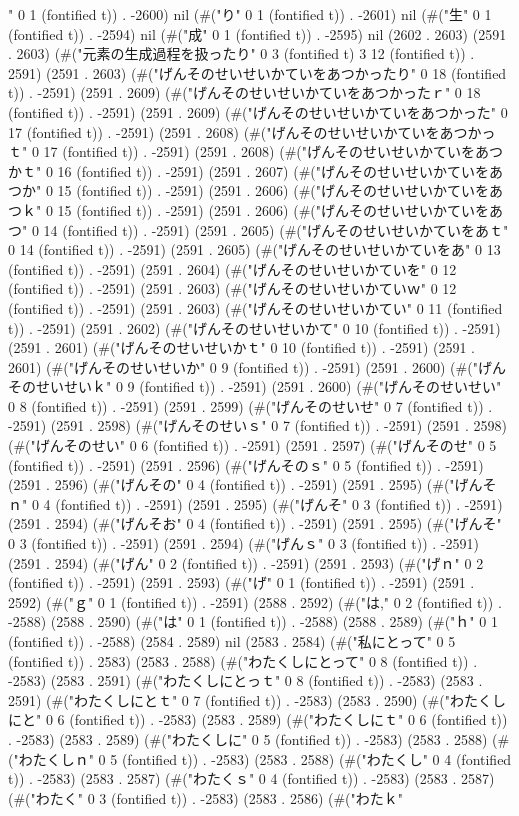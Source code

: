 " 0 1 (fontified t)) . -2600) nil (#("り" 0 1 (fontified t)) . -2601) nil (#("生" 0 1 (fontified t)) . -2594) nil (#("成" 0 1 (fontified t)) . -2595) nil (2602 . 2603) (2591 . 2603) (#("元素の生成過程を扱ったり" 0 3 (fontified t) 3 12 (fontified t)) . 2591) (2591 . 2603) (#("げんそのせいせいかていをあつかったり" 0 18 (fontified t)) . -2591) (2591 . 2609) (#("げんそのせいせいかていをあつかったｒ" 0 18 (fontified t)) . -2591) (2591 . 2609) (#("げんそのせいせいかていをあつかった" 0 17 (fontified t)) . -2591) (2591 . 2608) (#("げんそのせいせいかていをあつかっｔ" 0 17 (fontified t)) . -2591) (2591 . 2608) (#("げんそのせいせいかていをあつかｔ" 0 16 (fontified t)) . -2591) (2591 . 2607) (#("げんそのせいせいかていをあつか" 0 15 (fontified t)) . -2591) (2591 . 2606) (#("げんそのせいせいかていをあつｋ" 0 15 (fontified t)) . -2591) (2591 . 2606) (#("げんそのせいせいかていをあつ" 0 14 (fontified t)) . -2591) (2591 . 2605) (#("げんそのせいせいかていをあｔ" 0 14 (fontified t)) . -2591) (2591 . 2605) (#("げんそのせいせいかていをあ" 0 13 (fontified t)) . -2591) (2591 . 2604) (#("げんそのせいせいかていを" 0 12 (fontified t)) . -2591) (2591 . 2603) (#("げんそのせいせいかていｗ" 0 12 (fontified t)) . -2591) (2591 . 2603) (#("げんそのせいせいかてい" 0 11 (fontified t)) . -2591) (2591 . 2602) (#("げんそのせいせいかて" 0 10 (fontified t)) . -2591) (2591 . 2601) (#("げんそのせいせいかｔ" 0 10 (fontified t)) . -2591) (2591 . 2601) (#("げんそのせいせいか" 0 9 (fontified t)) . -2591) (2591 . 2600) (#("げんそのせいせいｋ" 0 9 (fontified t)) . -2591) (2591 . 2600) (#("げんそのせいせい" 0 8 (fontified t)) . -2591) (2591 . 2599) (#("げんそのせいせ" 0 7 (fontified t)) . -2591) (2591 . 2598) (#("げんそのせいｓ" 0 7 (fontified t)) . -2591) (2591 . 2598) (#("げんそのせい" 0 6 (fontified t)) . -2591) (2591 . 2597) (#("げんそのせ" 0 5 (fontified t)) . -2591) (2591 . 2596) (#("げんそのｓ" 0 5 (fontified t)) . -2591) (2591 . 2596) (#("げんその" 0 4 (fontified t)) . -2591) (2591 . 2595) (#("げんそｎ" 0 4 (fontified t)) . -2591) (2591 . 2595) (#("げんそ" 0 3 (fontified t)) . -2591) (2591 . 2594) (#("げんそお" 0 4 (fontified t)) . -2591) (2591 . 2595) (#("げんそ" 0 3 (fontified t)) . -2591) (2591 . 2594) (#("げんｓ" 0 3 (fontified t)) . -2591) (2591 . 2594) (#("げん" 0 2 (fontified t)) . -2591) (2591 . 2593) (#("げｎ" 0 2 (fontified t)) . -2591) (2591 . 2593) (#("げ" 0 1 (fontified t)) . -2591) (2591 . 2592) (#("ｇ" 0 1 (fontified t)) . -2591) (2588 . 2592) (#("は," 0 2 (fontified t)) . -2588) (2588 . 2590) (#("は" 0 1 (fontified t)) . -2588) (2588 . 2589) (#("ｈ" 0 1 (fontified t)) . -2588) (2584 . 2589) nil (2583 . 2584) (#("私にとって" 0 5 (fontified t)) . 2583) (2583 . 2588) (#("わたくしにとって" 0 8 (fontified t)) . -2583) (2583 . 2591) (#("わたくしにとっｔ" 0 8 (fontified t)) . -2583) (2583 . 2591) (#("わたくしにとｔ" 0 7 (fontified t)) . -2583) (2583 . 2590) (#("わたくしにと" 0 6 (fontified t)) . -2583) (2583 . 2589) (#("わたくしにｔ" 0 6 (fontified t)) . -2583) (2583 . 2589) (#("わたくしに" 0 5 (fontified t)) . -2583) (2583 . 2588) (#("わたくしｎ" 0 5 (fontified t)) . -2583) (2583 . 2588) (#("わたくし" 0 4 (fontified t)) . -2583) (2583 . 2587) (#("わたくｓ" 0 4 (fontified t)) . -2583) (2583 . 2587) (#("わたく" 0 3 (fontified t)) . -2583) (2583 . 2586) (#("わたｋ" 